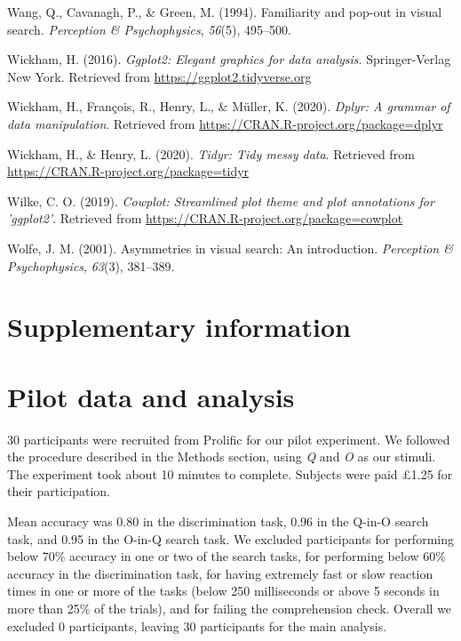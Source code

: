 \documentclass[
  english,
  man,floatsintext]{apa6}
\begin{document}
\leavevmode\hypertarget{ref-wang1994familiarity}{}%
Wang, Q., Cavanagh, P., \& Green, M. (1994). Familiarity and pop-out in visual search. \emph{Perception \& Psychophysics}, \emph{56}(5), 495--500.

\leavevmode\hypertarget{ref-R-ggplot2}{}%
Wickham, H. (2016). \emph{Ggplot2: Elegant graphics for data analysis}. Springer-Verlag New York. Retrieved from \url{https://ggplot2.tidyverse.org}

\leavevmode\hypertarget{ref-R-dplyr}{}%
Wickham, H., François, R., Henry, L., \& Müller, K. (2020). \emph{Dplyr: A grammar of data manipulation}. Retrieved from \url{https://CRAN.R-project.org/package=dplyr}

\leavevmode\hypertarget{ref-R-tidyr}{}%
Wickham, H., \& Henry, L. (2020). \emph{Tidyr: Tidy messy data}. Retrieved from \url{https://CRAN.R-project.org/package=tidyr}

\leavevmode\hypertarget{ref-R-cowplot}{}%
Wilke, C. O. (2019). \emph{Cowplot: Streamlined plot theme and plot annotations for 'ggplot2'}. Retrieved from \url{https://CRAN.R-project.org/package=cowplot}

\leavevmode\hypertarget{ref-wolfe2001asymmetries}{}%
Wolfe, J. M. (2001). Asymmetries in visual search: An introduction. \emph{Perception \& Psychophysics}, \emph{63}(3), 381--389.

\endgroup

\newpage

\hypertarget{supplementary-information}{%
\section{Supplementary information}\label{supplementary-information}}

\hypertarget{pilot-data-and-analysis}{%
\section{Pilot data and analysis}\label{pilot-data-and-analysis}}

30 participants were recruited from Prolific for our pilot experiment. We followed the procedure described in the Methods section, using \emph{Q} and \emph{O} as our stimuli. The experiment took about 10 minutes to complete. Subjects were paid £1.25 for their participation.

Mean accuracy was 0.80 in the discrimination task, 0.96 in the Q-in-O search task, and 0.95 in the O-in-Q search task. We excluded participants for performing below 70\% accuracy in one or two of the search tasks, for performing below 60\% accuracy in the discrimination task, for having extremely fast or slow reaction times in one or more of the tasks (below 250 milliseconds or above 5 seconds in more than 25\% of the trials), and for failing the comprehension check. Overall we excluded 0 participants, leaving 30 participants for the main analysis.
\end{document}
